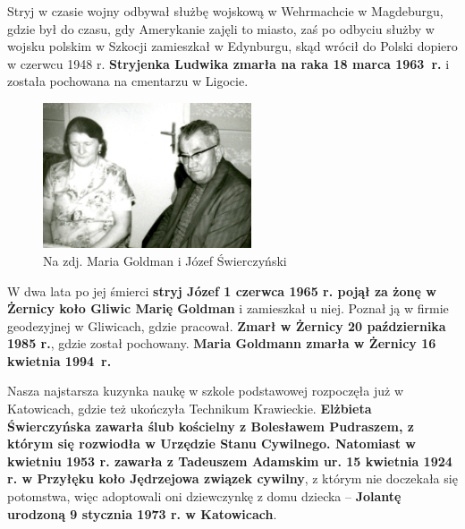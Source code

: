 Stryj w czasie wojny odbywał służbę wojskową w Wehrmachcie w Magdeburgu, gdzie był do czasu, gdy Amerykanie zajęli to miasto, zaś po odbyciu służby w wojsku polskim w Szkocji zamieszkał w Edynburgu, skąd wrócił do Polski dopiero w czerwcu 1948 r. \textbf{Stryjenka Ludwika zmarła na raka 18 marca 1963~r.} i została pochowana na cmentarzu w Ligocie.

\begin{figure}[!h]
\begin{center}
\includegraphics[width=0.55\textwidth]{photo/jozef_maria_swierczynscy.jpg}
\caption{Na zdj. Maria Goldman i Józef Świerczyński}
\label{rys:jozef_maria_swierczynscy}
\end{center}
\end{figure}

W dwa lata po jej śmierci \textbf{stryj Józef 1 czerwca 1965 r. pojął za żonę w Żernicy koło Gliwic Marię Goldman} i zamieszkał u niej. Poznał ją w firmie geodezyjnej w Gliwicach, gdzie pracował. \textbf{Zmarł w Żernicy 20 października 1985 r.}, gdzie  został pochowany. \textbf{Maria Goldmann zmarła w Żernicy 16 kwietnia 1994~r.}

Nasza najstarsza kuzynka naukę w szkole podstawowej rozpoczęła już w Katowicach, gdzie też ukończyła Technikum Krawieckie. \textbf{Elżbieta Świerczyńska zawarła ślub kościelny z Bolesławem Pudraszem, z którym się rozwiodła w Urzędzie Stanu Cywilnego. Natomiast w kwietniu 1953 r. zawarła z Tadeuszem Adamskim ur. 15 kwietnia 1924 r. w Przyłęku koło Jędrzejowa związek cywilny}, z którym nie doczekała się potomstwa, więc adoptowali oni dziewczynkę z domu dziecka -- \textbf{Jolantę urodzoną 9 stycznia 1973 r. w Katowicach}. 

